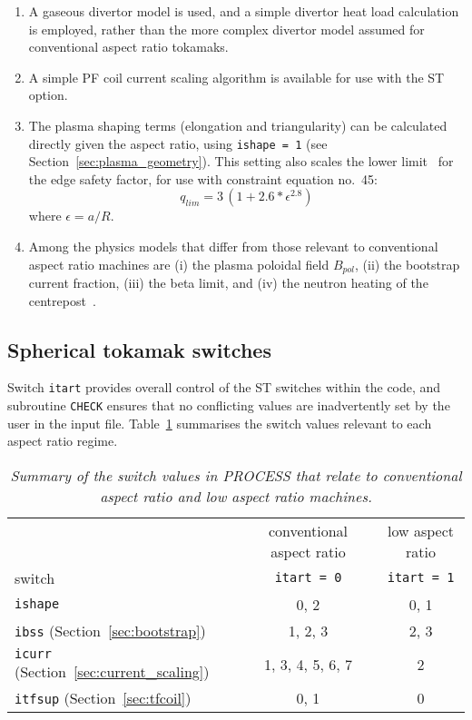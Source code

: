 \documentclass[11pt,a4paper]{report}
\newcommand{\process}{\mbox{\texttt{PROCESS}}}
\begin{document}
\begin{enumerate}
\item A gaseous divertor model is used, and a simple divertor heat load
  calculation is employed, rather than the more complex divertor model assumed
  for conventional aspect ratio tokamaks.

\item A simple PF coil current scaling algorithm is available for use with the
  ST option.

\item The plasma shaping terms (elongation and triangularity) can be
  calculated directly given the aspect ratio, using \texttt{ishape = 1} (see
  Section~\ref{sec:plasma_geometry}). This setting also scales the lower
  limit~\cite{storac} for the edge safety factor, for use with constraint
  equation no.\ 45:
  \begin{equation}
    q_{lim} = 3 \, (1 + 2.6*\epsilon^{2.8})
  \end{equation}
  where $\epsilon = a/R$. 

\item Among the physics models that differ from those relevant to conventional
  aspect ratio machines are (i) the plasma poloidal field $B_{pol}$, (ii) the
  bootstrap current fraction, (iii) the beta limit, and (iv) the neutron
  heating of the centrepost~\cite{storac}.

\end{enumerate}

\subsection{Spherical tokamak switches}

Switch \texttt{itart} provides overall control of the ST switches within the
code, and subroutine \texttt{CHECK} ensures that no conflicting values are
inadvertently set by the user in the input file. Table~\ref{tab:tart}
summarises the switch values relevant to each aspect ratio regime.
\begin{table}[tbph]
\begin{center}
  \begin{tabular}{||l|c|c||} \hline
    & conventional aspect ratio & low aspect ratio \\
    switch & \texttt{itart = 0} & \texttt{itart = 1} \\ \hline
    \texttt{ishape} & 0, 2 & 0, 1 \\
    \texttt{ibss} (Section~\ref{sec:bootstrap}) & 1, 2, 3 & 2, 3 \\
    \texttt{icurr} (Section~\ref{sec:current_scaling}) & 1, 3, 4, 5, 6, 7 & 2 \\
    \texttt{itfsup} (Section~\ref{sec:tfcoil}) & 0, 1 & 0 \\
    \hline
\end{tabular}
\end{center}
\caption[\process\ switches for spherical tokamaks]
{\label{tab:tart}
  \textit{Summary of the switch values in PROCESS that relate to
    conventional aspect ratio and low aspect ratio machines.}
}
\end{table}
\end{document}
